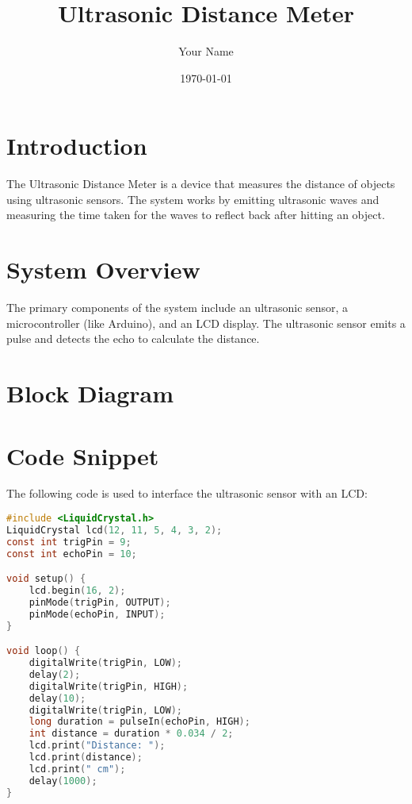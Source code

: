 \documentclass{article}
\title{Ultrasonic Distance Meter}
\author{Your Name}
\date{\today}
\begin{document}
\maketitle

\section*{Introduction}
The Ultrasonic Distance Meter is a device that measures the distance of objects using ultrasonic sensors. The system works by emitting ultrasonic waves and measuring the time taken for the waves to reflect back after hitting an object.

\section*{System Overview}
The primary components of the system include an ultrasonic sensor, a microcontroller (like Arduino), and an LCD display. The ultrasonic sensor emits a pulse and detects the echo to calculate the distance.

\section*{Block Diagram}
\begin{center}
\end{center}

\section*{Code Snippet}
The following code is used to interface the ultrasonic sensor with an LCD:

\begin{lstlisting}[language=C]
#include <LiquidCrystal.h>
LiquidCrystal lcd(12, 11, 5, 4, 3, 2);
const int trigPin = 9;
const int echoPin = 10;

void setup() {
    lcd.begin(16, 2);
    pinMode(trigPin, OUTPUT);
    pinMode(echoPin, INPUT);
}

void loop() {
    digitalWrite(trigPin, LOW);
    delay(2);
    digitalWrite(trigPin, HIGH);
    delay(10);
    digitalWrite(trigPin, LOW);
    long duration = pulseIn(echoPin, HIGH);
    int distance = duration * 0.034 / 2;
    lcd.print("Distance: ");
    lcd.print(distance);
    lcd.print(" cm");
    delay(1000);
}
\end{lstlisting}
\end{document}
